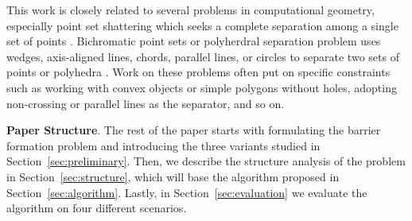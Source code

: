This work is closely related to several problems in computational geometry, especially point set shattering which seeks a complete separation among a single set of points \cite{freimer1991complexity, har2020separating}. 
Bichromatic point sets or polyherdral separation problem uses wedges, axis-aligned lines, chords, parallel lines, or circles to separate two sets of points or polyhedra \cite{devillers2001separating,armaselu2017geometric,boissonnat2001circular, demaine2005separating}. 
Work on these problems often put on specific constraints such as working with convex objects or simple polygons without holes, adopting non-crossing or parallel lines as the separator, and so on. 

\noindent \textbf{Paper Structure}.
The rest of the paper starts with formulating the barrier formation problem and introducing the three variants studied in Section~\ref{sec:preliminary}. 
Then, we describe the structure analysis of the problem in Section~\ref{sec:structure}, which will base the algorithm
proposed in Section~\ref{sec:algorithm}. Lastly, in Section~\ref{sec:evaluation} we evaluate the algorithm on four different scenarios. %



